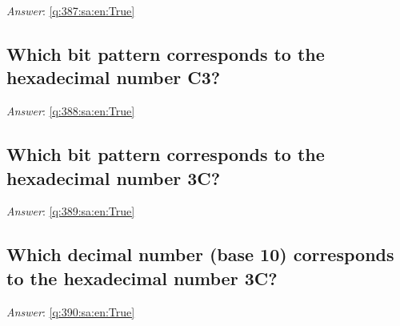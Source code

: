 \documentclass[a4paper,11pt,oneside]{article}
\begin{document}
\begin{sloppypar}
\label{q:387:sa:en:False}

\vspace{2cm}

\noindent\makebox[\textwidth]{\hrulefill}

\vspace{1cm}

\textit{Answer}: \autoref{q:387:sa:en:True}



\subsection{Which bit pattern corresponds to the hexadecimal number C3?}

\label{q:388:sa:en:False}

\vspace{2cm}

\noindent\makebox[\textwidth]{\hrulefill}

\vspace{1cm}

\textit{Answer}: \autoref{q:388:sa:en:True}



\subsection{Which bit pattern corresponds to the hexadecimal number 3C?}

\label{q:389:sa:en:False}

\vspace{2cm}

\noindent\makebox[\textwidth]{\hrulefill}

\vspace{1cm}

\textit{Answer}: \autoref{q:389:sa:en:True}



\subsection{Which decimal number (base 10) corresponds to the hexadecimal number 3C?}

\label{q:390:sa:en:False}

\vspace{2cm}

\noindent\makebox[\textwidth]{\hrulefill}

\vspace{1cm}

\textit{Answer}: \autoref{q:390:sa:en:True}




\end{sloppypar}
\end{document}
